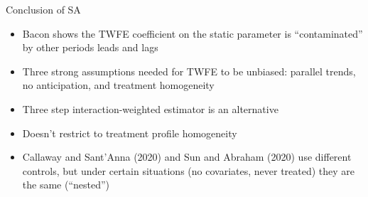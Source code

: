 \documentclass{beamer}
\begin{document}
\begin{frame}{Conclusion of SA}

\begin{itemize}
\item Bacon shows the TWFE coefficient on the static parameter is ``contaminated'' by other periods leads and lags
\item Three strong assumptions needed for TWFE to be unbiased: parallel trends, no anticipation, and treatment homogeneity
\item Three step interaction-weighted estimator is an alternative
\item Doesn't restrict to treatment profile homogeneity 
\item Callaway and Sant'Anna (2020) and Sun and Abraham (2020) use different controls, but under certain situations (no covariates, never treated) they are the same (``nested'')
\end{itemize}

\end{frame}
\end{document}
